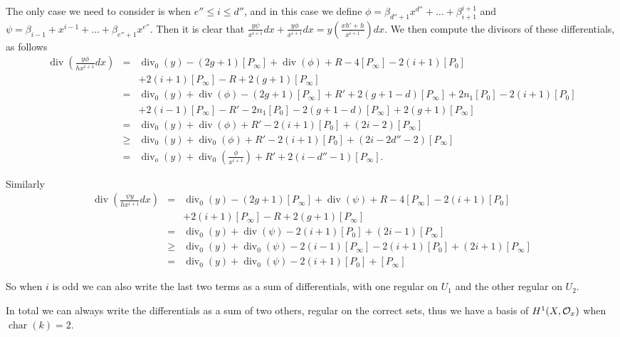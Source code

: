 \documentclass[draft, 11pt]{article} %
\theoremstyle{plain}
\theoremstyle{remark}
\newcommand{\cO}{{\cal O}}
\DeclareMathOperator{\di}{div}
\DeclareMathOperator{\cha}{char}
\begin{document}
The only case we need to consider is when $e'' \leq i \leq d''$, and in this case we define $\phi = \beta_{d''+1} x^{d''} + \ldots + \beta_{i+1}^{i+1}$ and $\psi = \beta_{i-1} + x^{i-1} + \ldots + \beta_{e''+1}x^{e''}$.
Then it is clear that $\frac{y\psi}{x^{i+1}}dx + \frac{y\phi}{x^{i+1}}dx = y\left( \frac{xh' + h}{x^{i+1}} \right) dx$.
We then compute the divisors of these differentials, as follows
\begin{eqnarray*}
 \di \left( \frac{y \phi}{hx^{i+1}} dx \right) & = & \di_0(y) - (2g+1)[P_\infty] + \di( \phi) + R - 4[P_\infty] - 2(i+1)[P_0] \\
& ~ & + 2(i+1)[P_\infty] -R + 2(g+1)[P_\infty] \\
& = & \di_0(y) + \di(\phi) -(2g+1)[P_\infty] + R' + 2(g+1-d)[P_\infty] + 2n_1[P_0] - 2(i+1)[P_0] \\ 
& ~ & + 2(i-1)[P_\infty] -R' - 2n_1[P_0]- 2(g+1-d)[P_\infty] +2(g+1)[P_\infty] \\
& = & \di_0(y) + \di(\phi) + R' - 2(i +1)[P_0] + (2i-2)[P_\infty] \\
& \geq & \di_0(y) + \di_0(\phi) + R' - 2(i + 1)[P_0] + (2i - 2d'' - 2)[P_\infty] \\
& = & \di_o(y) + \di_0\left( \frac{\phi}{x^{i+1}} \right) + R' + 2(i - d'' -1)[P_\infty]. 
\end{eqnarray*}

Similarly 
\begin{eqnarray*}
\di \left( \frac{\psi y}{hx^{i+1}} dx \right) & = & \di_0(y) -(2g+1)[P_\infty] + \di(\psi) +R -4[P_\infty] - 2(i+1)[P_0] \\
&  & + 2(i+1)[P_\infty] - R + 2(g+1)[P_\infty] \\
& = & \di_0(y) + \di(\psi) -2(i+1)[P_0] + (2i-1)[P_\infty] \\
& \geq & \di_0(y) + \di_0(\psi) - 2(i-1)[P_\infty] - 2(i+1)[P_0] + (2i+1)[P_\infty] \\
& = & \di_0(y) + \di_0(\psi) - 2(i+1)[P_0] + [P_\infty]
\end{eqnarray*}


So when $i$ is odd we can also write the last two terms as a sum of differentials, with one regular on $U_1$ and the other regular on $U_2$. 

In total we can always write the differentials as a sum of two others, regular on the correct sets, thus we have a basis of $H^1(X,\cO_x)$ when $\cha (k) =2$.



%

\end{document}

